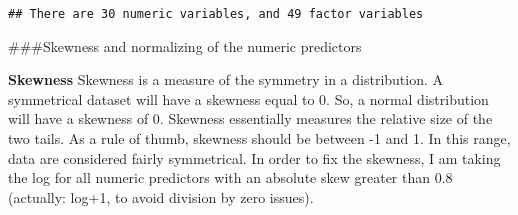 \documentclass[]{article}
\newenvironment{Shaded}{\begin{snugshade}}{\end{snugshade}}
\newcommand{\CommentTok}[1]{\textcolor[rgb]{0.56,0.35,0.01}{\textit{#1}}}
\newcommand{\KeywordTok}[1]{\textcolor[rgb]{0.13,0.29,0.53}{\textbf{#1}}}
\newcommand{\NormalTok}[1]{#1}
\newcommand{\OperatorTok}[1]{\textcolor[rgb]{0.81,0.36,0.00}{\textbf{#1}}}
\newcommand{\StringTok}[1]{\textcolor[rgb]{0.31,0.60,0.02}{#1}}
\begin{document}
\begin{Shaded}
\end{Shaded}

\begin{verbatim}
## There are 30 numeric variables, and 49 factor variables
\end{verbatim}

\#\#\#Skewness and normalizing of the numeric predictors

\textbf{Skewness} Skewness is a measure of the symmetry in a
distribution. A symmetrical dataset will have a skewness equal to 0. So,
a normal distribution will have a skewness of 0. Skewness essentially
measures the relative size of the two tails. As a rule of thumb,
skewness should be between -1 and 1. In this range, data are considered
fairly symmetrical. In order to fix the skewness, I am taking the log
for all numeric predictors with an absolute skew greater than 0.8
(actually: log+1, to avoid division by zero issues).
\end{document}
